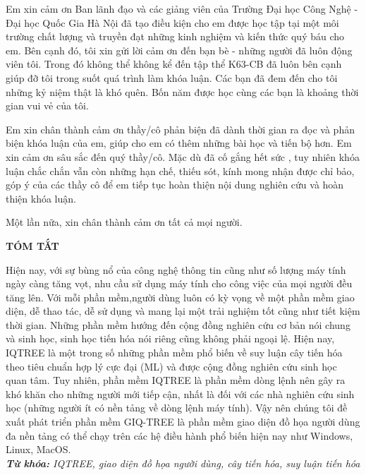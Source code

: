 \documentclass[12pt]{report}
\begin{document}
Em xin cảm ơn Ban lãnh đạo và các giảng viên của Trường Đại học Công Nghệ - Đại học Quốc Gia Hà Nội đã tạo điều kiện cho em được học tập tại một môi trường chất lượng và truyền đạt những kinh nghiệm và kiến thức quý báu cho em. Bên cạnh đó, tôi xin gửi lời cảm ơn đến bạn bè - những người đã luôn động viên tôi. Trong đó không thể không kể đến tập thể K63-CB đã luôn bên cạnh giúp đỡ tôi trong suốt quá trình làm khóa luận. Các bạn đã đem đến cho tôi những kỷ niệm thật là khó quên. Bốn năm được học cùng các bạn là khoảng thời gian vui vẻ của tôi.

Em xin chân thành cảm ơn thầy/cô phản biện đã dành thời gian ra đọc và phản biện khóa luận của em, giúp cho em có thêm những bài học và tiến bộ hơn. Em xin cảm ơn sâu sắc đến quý thầy/cô.
Mặc dù đã cố gắng hết sức , tuy nhiên khóa luận chắc chắn vẫn còn những hạn chế, thiếu sót, kính mong nhận được chỉ bảo, góp ý của các thầy cô để em tiếp tục hoàn thiện nội dung nghiên cứu và hoàn thiện khóa luận.

Một lần nữa, xin chân thành cảm ơn tất cả mọi người.


	
\newpage
\begin{center}
	\textbf{\large TÓM TẮT}
\end{center}

Hiện nay, với sự bùng nổ của công nghệ thông tin cũng như số lượng máy tính ngày càng tăng vọt, nhu cầu sử dụng máy tính cho công việc của mọi người đều tăng lên. Với mỗi phần mềm,người dùng luôn có kỳ vọng về một phần mềm giao diện, dễ thao tác, dễ sử dụng và mang lại một trải nghiệm tốt cũng như tiết kiệm thời gian. Những phần mềm hướng đến cộng đồng nghiên cứu cơ bản nói chung và sinh học, sinh học tiến hóa nói riêng cũng không phải ngoại lệ. Hiện nay, IQTREE là một trong số những phần mềm phổ biến về suy luận cây tiến hóa theo tiêu chuẩn hợp lý cực đại (ML) và được cộng đồng nghiên cứu sinh học quan tâm. Tuy nhiên, phần mềm IQTREE là phần mềm dòng lệnh nên gây ra khó khăn cho những người mới tiếp cận, nhất là đối với các nhà nghiên cứu sinh học (những người ít có nền tảng về dòng lệnh máy tính). Vậy nên chúng tôi đề xuất phát triển phần mềm GIQ-TREE là phần mềm giao diện đồ họa người dùng đa nền tảng có thể chạy trên các hệ điều hành phổ biến hiện nay như Windows, Linux, MacOS.\\

\noindent \textit{\textbf{Từ khóa:} IQTREE, giao diện đồ họa người dùng, cây tiến hóa, suy luận tiến hóa}
\end{document}
